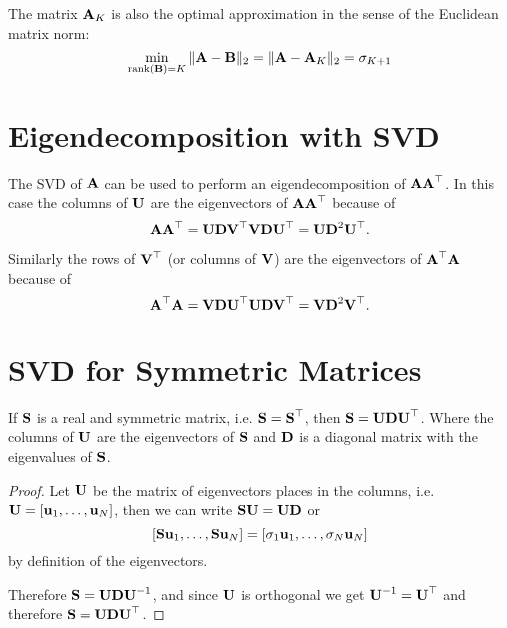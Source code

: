 The matrix \(\boldsymbol{\mathrm{A}}_K\) is also the optimal approximation in the sense of the Euclidean matrix norm:
\[
\min_{\operatorname{rank}(\boldsymbol{\mathrm{B}}) = K} \|\boldsymbol{\mathrm{A}} - \boldsymbol{\mathrm{B}}\|_2 = \|\boldsymbol{\mathrm{A}} - \boldsymbol{\mathrm{A}}_K\|_2 = \sigma_{K + 1}
\]

\section{Eigendecomposition with SVD}
The SVD of \(\boldsymbol{\mathrm{A}}\) can be used to perform an eigendecomposition of \(\boldsymbol{\mathrm{AA}}^\top\). In this case the columns of \(\boldsymbol{\mathrm{U}}\) are the eigenvectors of \(\boldsymbol{\mathrm{AA}}^\top\) because of 
\[
\boldsymbol{\mathrm{AA}}^\top = \boldsymbol{\mathrm{UDV}}^\top \boldsymbol{\mathrm{VDU}}^\top = \boldsymbol{\mathrm{UD}}^2\boldsymbol{\mathrm{U}}^\top.
\]

Similarly the rows of \(\boldsymbol{\mathrm{V}}^\top\) (or columns of \(\boldsymbol{\mathrm{V}}\)) are the eigenvectors of \(\boldsymbol{\mathrm{A}}^\top \boldsymbol{\mathrm{A}}\) because of
\[
\boldsymbol{\mathrm{A}}^\top \boldsymbol{\mathrm{A}} = \boldsymbol{\mathrm{VDU}}^\top \boldsymbol{\mathrm{UDV}}^\top = \boldsymbol{\mathrm{VD}}^2 \boldsymbol{\mathrm{V}}^\top.
\]


\section{SVD for Symmetric Matrices}
\begin{theorem}
If \(\boldsymbol{\mathrm{S}}\) is a real and symmetric matrix, i.e. \(\boldsymbol{\mathrm{S}} = \boldsymbol{\mathrm{S}}^\top\), then \(\boldsymbol{\mathrm{S}} = \boldsymbol{\mathrm{UDU}}^\top\). Where the columns of \(\boldsymbol{\mathrm{U}}\) are the eigenvectors of \(\boldsymbol{\mathrm{S}}\) and \(\boldsymbol{\mathrm{D}}\) is a diagonal matrix with the eigenvalues of \(\boldsymbol{\mathrm{S}}\).
\end{theorem}

\begin{proof}
Let \(\boldsymbol{\mathrm{U}}\) be the matrix of eigenvectors places in the columns, i.e. \(\boldsymbol{\mathrm{U}} = [\boldsymbol{\mathrm{u}}_1, \ldots, \boldsymbol{\mathrm{u}}_N]\), then we can write \(\boldsymbol{\mathrm{SU}} = \boldsymbol{\mathrm{UD}}\) or \[
[\boldsymbol{\mathrm{Su}}_1, \ldots, \boldsymbol{\mathrm{Su}}_N] = [\sigma_1 \boldsymbol{\mathrm{u}}_1, \ldots, \sigma_N \boldsymbol{\mathrm{u}}_N]
\]
by definition of the eigenvectors.

Therefore \(\boldsymbol{\mathrm{S}} = \boldsymbol{\mathrm{UDU}}^{-1}\), and since \(\boldsymbol{\mathrm{U}}\) is orthogonal we get \(\boldsymbol{\mathrm{U}}^{-1} = \boldsymbol{\mathrm{U}}^\top\) and therefore \(\boldsymbol{\mathrm{S}} = \boldsymbol{\mathrm{UDU}}^\top\).
\end{proof}

